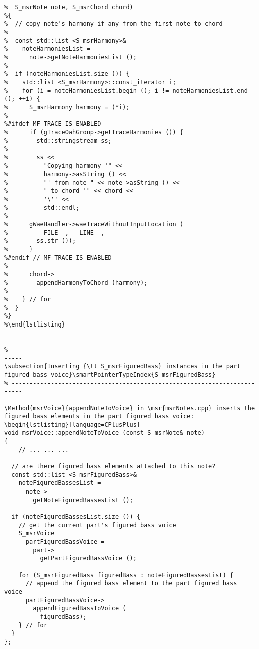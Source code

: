 %
\begin{lstlisting}[language=CPlusPlus]
%void mxsr2msrTranslator::copyNoteHarmoniesToChord (
%  S_msrNote note, S_msrChord chord)
%{
%  // copy note's harmony if any from the first note to chord
%
%  const std::list <S_msrHarmony>&
%    noteHarmoniesList =
%      note->getNoteHarmoniesList ();
%
%  if (noteHarmoniesList.size ()) {
%    std::list <S_msrHarmony>::const_iterator i;
%    for (i = noteHarmoniesList.begin (); i != noteHarmoniesList.end (); ++i) {
%      S_msrHarmony harmony = (*i);
%
%#ifdef MF_TRACE_IS_ENABLED
%      if (gTraceOahGroup->getTraceHarmonies ()) {
%        std::stringstream ss;
%
%        ss <<
%          "Copying harmony '" <<
%          harmony->asString () <<
%          "' from note " << note->asString () <<
%          " to chord '" << chord <<
%          '\'' <<
%          std::endl;
%
%      gWaeHandler->waeTraceWithoutInputLocation (
%        __FILE__, __LINE__,
%        ss.str ());
%      }
%#endif // MF_TRACE_IS_ENABLED
%
%      chord->
%        appendHarmonyToChord (harmony);
%
%    } // for
%  }
%}
%\end{lstlisting}


\subsection{Inserting {\tt S_msrFiguredBass} instances in the part figured bass voice}\smartPointerTypeIndex{S_msrFiguredBass}

\Method{msrVoice}{appendNoteToVoice} in \msr{msrNotes.cpp} inserts the figured bass elements in the part figured bass voice:
\begin{lstlisting}[language=CPlusPlus]
void msrVoice::appendNoteToVoice (const S_msrNote& note)
{
	// ... ... ...

  // are there figured bass elements attached to this note?
  const std::list <S_msrFiguredBass>&
    noteFiguredBassesList =
      note->
        getNoteFiguredBassesList ();

  if (noteFiguredBassesList.size ()) {
    // get the current part's figured bass voice
    S_msrVoice
      partFiguredBassVoice =
        part->
          getPartFiguredBassVoice ();

    for (S_msrFiguredBass figuredBass : noteFiguredBassesList) {
      // append the figured bass element to the part figured bass voice
      partFiguredBassVoice->
        appendFiguredBassToVoice (
          figuredBass);
    } // for
  }
};
\end{lstlisting}


